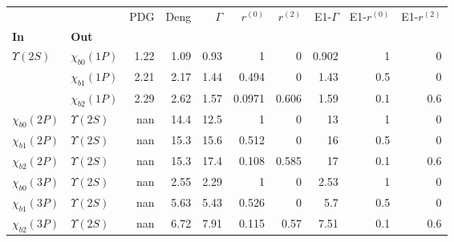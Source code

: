 \begin{tabular}{l|l|r|r|r|r|r|r|r|r}
\toprule
                &                &  PDG &  Deng &  $\Gamma$ &  $r^{(0)}$ &  $r^{(2)}$ &  E1-$\Gamma$ &  E1-$r^{(0)}$ &  E1-$r^{(2)}$ \\
\textbf{In} & \textbf{Out} &      &       &           &            &            &              &               &               \\
\midrule
\textbf{$\Upsilon(2S)$} & \textbf{$\chi_{b0}(1P)$} & 1.22 &  1.09 &      0.93 &          1 &          0 &        0.902 &             1 &             0 \\
                & \textbf{$\chi_{b1}(1P)$} & 2.21 &  2.17 &      1.44 &      0.494 &          0 &         1.43 &           0.5 &             0 \\
                & \textbf{$\chi_{b2}(1P)$} & 2.29 &  2.62 &      1.57 &     0.0971 &      0.606 &         1.59 &           0.1 &           0.6 \\
\textbf{$\chi_{b0}(2P)$} & \textbf{$\Upsilon(2S)$} &  nan &  14.4 &      12.5 &          1 &          0 &           13 &             1 &             0 \\
\textbf{$\chi_{b1}(2P)$} & \textbf{$\Upsilon(2S)$} &  nan &  15.3 &      15.6 &      0.512 &          0 &           16 &           0.5 &             0 \\
\textbf{$\chi_{b2}(2P)$} & \textbf{$\Upsilon(2S)$} &  nan &  15.3 &      17.4 &      0.108 &      0.585 &           17 &           0.1 &           0.6 \\
\textbf{$\chi_{b0}(3P)$} & \textbf{$\Upsilon(2S)$} &  nan &  2.55 &      2.29 &          1 &          0 &         2.53 &             1 &             0 \\
\textbf{$\chi_{b1}(3P)$} & \textbf{$\Upsilon(2S)$} &  nan &  5.63 &      5.43 &      0.526 &          0 &          5.7 &           0.5 &             0 \\
\textbf{$\chi_{b2}(3P)$} & \textbf{$\Upsilon(2S)$} &  nan &  6.72 &      7.91 &      0.115 &       0.57 &         7.51 &           0.1 &           0.6 \\
\bottomrule
\end{tabular}
